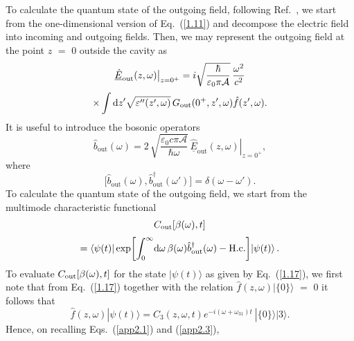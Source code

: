 \documentclass[pra, twocolumn]{revtex4}
\newcommand{\D}{\mbox{\rm d}}
\newcommand{\uh}[1]{\underline{\hat{#1}}}
\begin{document}
To calculate the quantum state of the outgoing field, following
Ref.~\cite{khanbekyan:013822}, we start from
the one-dimensional version of Eq.~(\ref{1.11}) and decompose the
electric field 
into incoming and outgoing fields. Then, we may represent the outgoing
field at the point $z$ $\!=$ $\!0$ outside the cavity as
\begin{multline}
      \label{app2.1}
     \uh{ E}_{\mathrm{out}}(z,\omega)
       \bigr|_{z=0^+}
      = i \sqrt{\frac {\hbar }{\varepsilon _0\pi \mathcal{A}}}\,
      \frac{\omega^2}{c^2}
\\[.5ex]
\times
      \int \D z'\sqrt{\varepsilon''(z',\omega)}\,
      G_{\rm out}(0^+,z',\omega)
      \hat{f}(z',\omega).
\end{multline}
It is useful to introduce
the bosonic operators
\begin{equation}
      \label{app2.3}
      \hat{ b}_{\mathrm{out}}  (\omega)
      = 2\,\sqrt{\frac{\varepsilon_0 c \pi\mathcal{A}}{\hbar\omega}}
     \,\left.\uh{ E}_{\mathrm{out}}(z, \omega)
     \right|_{z=0^+}
,
\end{equation}
where
\begin{equation}
  \label{app2.5}
  \bigl[\hat{b}_{\mathrm{out}}(\omega),
       \hat{b}_{\mathrm{out}}^\dagger(\omega')\bigr]
       =
\delta (\omega - \omega ').
\end{equation}
To calculate the quantum state of the outgoing field,
we start from the multimode characteristic functional
\begin{multline}
\label{app2.7}
C_{{\rm out}}[\beta(\omega),t]
\\[.5ex]
         =
         \left
          \langle
           \psi(t)
         \right|
         \exp\!\left[
         \int_0^{\infty}\!
         \D\omega\,
         \beta(\omega) \hat{b}^{\dagger}_{\mathrm {out}}(\omega)
         - \mathrm{H.c.}\right]\!
       \left|
       \psi(t)
        \right
        \rangle
.
\end{multline}
To evaluate $C_{{\rm out}}[\beta(\omega),t]$ for the
state $|\psi(t)\rangle$ as given by Eq.~(\ref{1.17}), we
first note that from Eq.~(\ref{1.17}) together with the relation
$\hat{f}(z, \omega)|\lbrace 0\rbrace\rangle$
$\!=$ $\!0$ it follows that
\begin{equation}
  \label{app2.9}
   \hat{f}(z, \omega) |\psi(t)\rangle =
    C_3(z, \omega, t) 
    e^{-i(\omega+\omega_{31}) t}\
   |\lbrace 0\rbrace\rangle
|3\rangle
   .
\end{equation}
Hence, on recalling Eqs.~(\ref{app2.1}) and (\ref{app2.3}),
\end{document}
